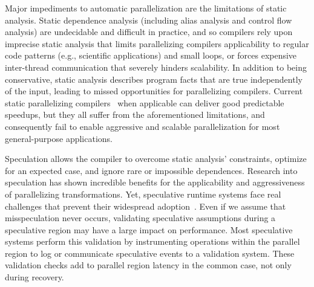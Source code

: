 Major impediments to automatic parallelization are the limitations of static
analysis. Static dependence analysis (including alias analysis and control flow
analysis) are undecidable and difficult in practice, and so compilers rely upon
imprecise static analysis that limits parallelizing compilers applicability to
regular code patterns (e.g., scientific applications) and small loops, or forces
expensive inter-thread communication that severely hinders scalability.
%
In addition to being conservative, static analysis describes program facts that
are true independently of the input, leading to missed opportunities for
parallelizing compilers.
Current static parallelizing compilers~\cite{HELIX, PS-DSWP, SUIF, non-SPEC
doall ...} when applicable can deliver good predictable speedups, but they all
suffer from the aforementioned limitations, and consequently fail to enable
aggressive and scalable parallelization for most general-purpose applications.

Speculation allows the compiler to overcome static analysis' constraints,
optimize for an expected
case, and ignore rare or impossible dependences.  Research into speculation has
shown incredible benefits for the applicability and aggressiveness of
parallelizing transformations.
%
Yet, speculative runtime systems face real challenges that prevent their
widespread adoption~\cite{cascaval:08:stmtoy:short, ..}. Even if we assume that
misspeculation never occurs, validating speculative assumptions during a
speculative region may have a large impact on performance.
%
Most speculative systems perform this validation by instrumenting operations
within the parallel region to log or communicate speculative events to a
validation system.  These validation checks add to parallel region latency in
the common case, not only during recovery.

